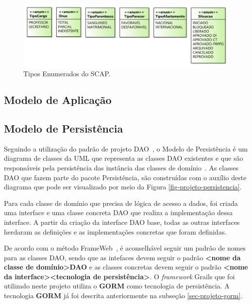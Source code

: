\begin{figure}[h]
	\centering
	\includegraphics[scale=0.4]{figuras/fig-projeto-enum} 
	\caption{Tipos Enumerados do SCAP.}
	\label{fig-projeto-enum}
\end{figure}

\subsection{Modelo de Aplicação}
\label{sec-projeto-modelo-aplicacao}

\subsection{Modelo de Persistência}
\label{sec-projeto-modelo-persistencia}

Seguindo a utilização do padrão de projeto DAO~\cite{alur-et-al:bpds03}, o Modelo de Persistência é um diagrama de classes da UML que representa as classes DAO existentes e que são responsáveis pela persistência das instância das classes de domínio~\cite{souza:masterthesis07}. As classes DAO que fazem parte do pacote Persistência, são construídas com o auxílio deste diagrama que pode ser visualizado por meio da Figura \ref{fig-projeto-persistencia}.

Para cada classe de domínio que precisa de lógica de acesso a dados, foi criada uma interface e uma classe concreta DAO que realiza a implementação dessa interface. A partir da criação da interface DAO base, todas as outras interfaces herdaram as definições e as implementações concretas que foram definidas.

De acordo com o método FrameWeb~\cite{souza:masterthesis07,souza-celebratingfalbo20}, é aconselhável seguir um padrão de nomes para as classes DAO, sendo que as intefaces devem seguir o padrão \textbf{<nome da classe de domínio>DAO} e as classes concretas devem seguir o padrão \textbf{<nome da interface><tecnologia de persistência>}. O \textit{framework} Grails que foi utilizado neste projeto utiliza o \textbf{GORM} como tecnologia de persistência. A tecnologia \textbf{GORM} já foi descrita anteriormente na subseção \ref{sec-projeto-gorm}.

